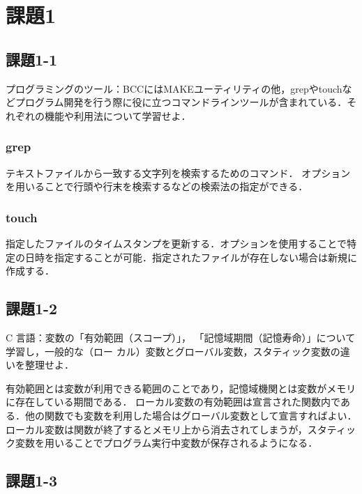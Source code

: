 \documentclass[twocolumn]{jsarticle}
\begin{document}
\section{課題1}
\subsection{課題1-1}
プログラミングのツール：BCCにはMAKEユーティリティの他，grepやtouchなどプログラム開発を行う際に役に立つコマンドラインツールが含まれている．それぞれの機能や利用法について学習せよ．

\subsubsection{grep}

テキストファイルから一致する文字列を検索するためのコマンド．
オプションを用いることで行頭や行末を検索するなどの検索法の指定ができる．

\subsubsection{touch}

指定したファイルのタイムスタンプを更新する．オプションを使用することで特定の日時を指定することが可能．指定されたファイルが存在しない場合は新規に作成する．


\subsection{課題1-2}
C 言語：変数の「有効範囲（スコープ）」， 「記憶域期間（記憶寿命）」について学習し，一般的な（ロー
カル）変数とグローバル変数，スタティック変数の違いを整理せよ．

有効範囲とは変数が利用できる範囲のことであり，記憶域機関とは変数がメモリに存在している期間である．
ローカル変数の有効範囲は宣言された関数内である．他の関数でも変数を利用した場合はグローバル変数として宣言すればよい．
ローカル変数は関数が終了するとメモリ上から消去されてしまうが，スタティック変数を用いることでプログラム実行中変数が保存されるようになる．


\subsection{課題1-3}


\end{document}
